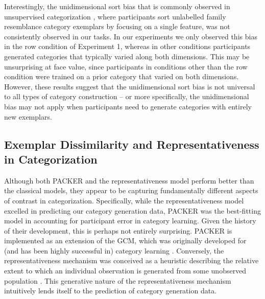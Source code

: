 \documentclass[12pt]{article}
\begin{document}
\begin{flushleft}
Interestingly, the unidimensional sort bias that is commonly observed in
unsupervised categorization
\citep{imai1965discriminability,milton2004influence,ahn1992two}, where
participants sort unlabelled family resemblance category exemplars by focusing
on a single feature, was not consistently observed in our tasks. In our
experiments we only observed this bias in the row condition of Experiment 1,
whereas in other conditions participants generated categories that typically
varied along both dimensions. This may be unsurprising at face value, since
participants in conditions other than the row condition were trained on a prior
category that varied on both dimensions. However, these results suggest that the
unidimensional sort bias is not universal to all types of category construction
-- or more specifically, the unidimensional bias may not apply when participants
need to generate categories with entirely new exemplars.

\subsection{Exemplar Dissimilarity and Representativeness in Categorization} 
Although both PACKER and the representativeness model perform better than the
classical models, they appear to be capturing fundamentally different aspects of
contrast in categorization. Specifically, while the representativeness model
excelled in predicting our category generation data, PACKER was the best-fitting
model in accounting for participant error in category learning. Given the
history of their development, this is perhaps not entirely surprising. PACKER
is implemented as an extension of the GCM, which was originally developed for (and
has been highly successful in) category learning \citep{nosofsky1986attention,
  nosofsky1994comparing}. Conversely, the representativeness mechanism was
conceived as a heuristic describing the relative extent to which an individual
observation is generated from some unobserved population
\citep{kahneman1972subjective,abbott16}. This generative nature of the
representativeness mechanism intuitively lends itself to the prediction of
category generation data. 


\end{flushleft}
\end{document}
